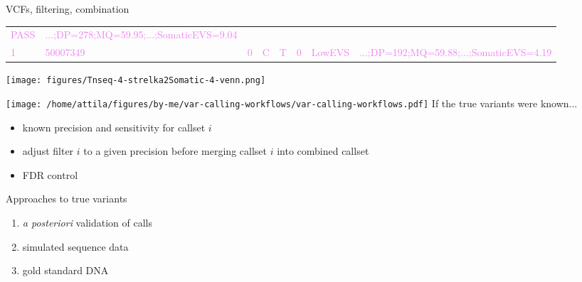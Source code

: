 \documentclass{beamer}
\begin{document}
\begin{frame}{VCFs, filtering, combination}
\begin{tabular}{llllllll}
\textcolor{violet}{PASS} &
\textcolor{violet}{...;DP=278;MQ=59.95;...;SomaticEVS=9.04} \\
\textcolor{violet}{1} &
\textcolor{violet}{50007349} &
\textcolor{violet}{0} &
\textcolor{violet}{C} &
\textcolor{violet}{T} &
\textcolor{violet}{0} &
\textcolor{violet}{LowEVS} &
\textcolor{violet}{...;DP=192;MQ=59.88;...;SomaticEVS=4.19} \\
\end{tabular}
\normalsize

\texttt{[image: figures/Tnseq-4-strelka2Somatic-4-venn.png]}
\end{frame}

\begin{frame}{}
\texttt{[image: /home/attila/figures/by-me/var-calling-workflows/var-calling-workflows.pdf]}
\vfill
{
{\large If the \alert{true variants} were known...}
}
\begin{itemize}
\item<2> known precision and sensitivity for \alert{callset \(i\)}
\item<2> adjust filter \(i\) to a given precision before merging \alert{callset \(i\)} into combined \alert{callset}
\item<2> FDR control
\end{itemize}
\end{frame}

\begin{frame}{Approaches to true variants}
\begin{enumerate}
\item \textit{a posteriori} validation of calls
\item simulated sequence data
\item gold standard DNA  
\end{enumerate}
\end{frame}
\end{document}
